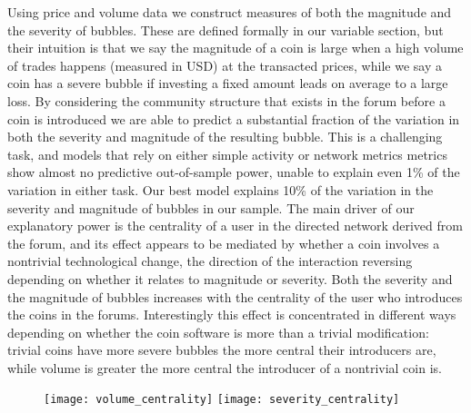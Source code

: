 Using price and volume data we construct measures of both the magnitude and the severity of bubbles.
These are defined formally in our variable section,
but their intuition is that we say the magnitude of a coin is large when a high volume of trades happens (measured in USD) 
at the transacted prices, while we say a coin has a severe bubble if investing a fixed amount leads on average to a large loss. 
By considering the community structure that exists in the forum before a coin is introduced we are able to predict a substantial fraction of the variation in both the severity and magnitude of the resulting bubble.
This is a challenging task, and models that rely on either simple activity or network metrics metrics show almost no predictive out-of-sample power, unable to explain even 1\% of the variation in either task.
Our best model explains 10\% of the variation in the severity and magnitude of bubbles in our sample.
The main driver of our explanatory power is the centrality of a user in the directed network derived from the forum, and its effect appears to be mediated by whether a coin involves a nontrivial technological change, the direction of the interaction reversing depending on whether it relates to magnitude or severity.
Both the severity and the magnitude of bubbles increases with the centrality of the user who introduces the coins in the forums.  
Interestingly this effect is concentrated in different ways depending on whether the coin software is more than a trivial modification: trivial coins have more severe bubbles the more central their introducers are, while volume is greater the more central the introducer of a nontrivial coin is.





\begin{figure}
\texttt{[image: volume\_centrality]}
\texttt{[image: severity\_centrality]}
\end{figure}


